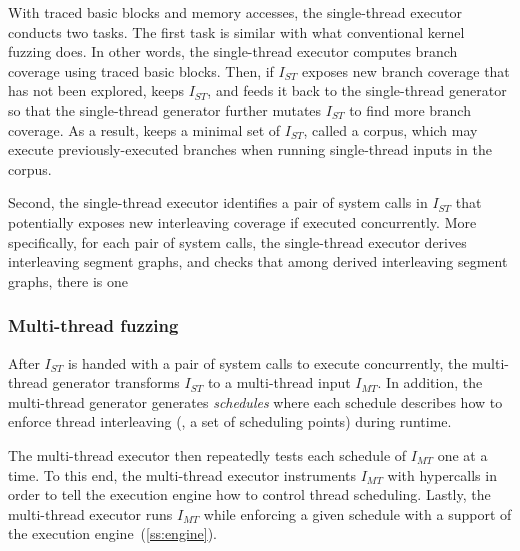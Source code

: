 With traced basic blocks and memory accesses, the single-thread
executor conducts two tasks.
%
The first task is similar with what conventional kernel fuzzing
does.
%
In other words, the single-thread executor computes branch coverage
using traced basic blocks.
%
Then, if $I_{ST}$ exposes new branch coverage that has not been
explored, \sys keeps $I_{ST}$, and feeds it back to the single-thread
generator so that the single-thread generator further mutates $I_{ST}$
to find more branch coverage.
%
As a result, \sys keeps a minimal set of $I_{ST}$, called
a corpus, which may execute previously-executed branches when running
single-thread inputs in the corpus.


Second, the single-thread executor identifies a pair of system calls
in $I_{ST}$ that potentially exposes new interleaving coverage if
executed concurrently.
%
More specifically, for each pair of system calls, the single-thread
executor derives interleaving segment graphs, and checks that among
derived interleaving segment graphs, there is one 
%



\subsubsection{Multi-thread fuzzing}
\label{sss:multithreadfuzzing}
%
After $I_{ST}$ is handed with a pair of system calls to execute
concurrently, the multi-thread generator transforms $I_{ST}$ to a
multi-thread input $I_{MT}$.
%
In addition, the multi-thread generator generates \textit{schedules}
where each schedule describes how to enforce thread interleaving (\ie,
a set of scheduling points) during runtime.


The multi-thread executor then repeatedly tests each schedule of
$I_{MT}$ one at a time.
%
To this end, the multi-thread executor instruments $I_{MT}$ with
hypercalls in order to tell the execution engine how to control thread
scheduling.
%
Lastly, the multi-thread executor runs $I_{MT}$ while enforcing a
given schedule with a support of the execution
engine~(\autoref{ss:engine}).




%





